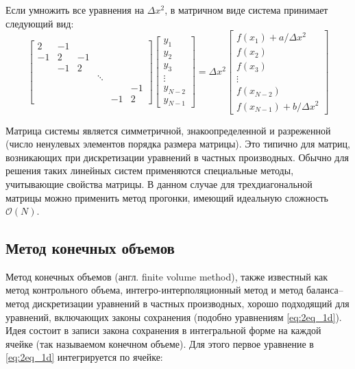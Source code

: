 \documentclass[a4paper, 11pt]{article}
\begin{document}
Если умножить все уравнения на $\Delta x ^2$, в матричном виде система принимает следующий вид:
\begin{equation}\label{eq:matrix_fd_1d}
	\begin{bmatrix}
		2  & -1 &   &       \\
		-1 &  2 & -1 \\
		   & -1 &  2 \\
		   &    &   & \ddots \\
		   &    &   &       &  & -1\\
		   &    &   &       & -1 & 2
		
	\end{bmatrix}
	\begin{bmatrix}
		y_1 \\ y_2 \\ y_3 \\ \vdots \\y_{N-2} \\ y_{N-1}
	\end{bmatrix}
	=
	\Delta x^2 
	\begin{bmatrix}
		f(x_1) + a/\Delta x^2 \\
		f(x_2)\\
		f(x_3)\\
		\vdots\\
		f(x_{N-2})\\
		f(x_{N-1}) + b/\Delta x^2 
	\end{bmatrix}
\end{equation}

Матрица системы является симметричной, знакоопределенной и разреженной (число ненулевых элементов порядка размера матрицы). Это типично для матриц, возникающих при дискретизации уравнений в частных производных. Обычно для решения таких линейных систем применяются специальные методы, учитывающие свойства матрицы. В данном случае для трехдиагональной матрицы можно применить метод прогонки, имеющий идеальную сложность $\mathcal{O}(N)$.

\subsection{Метод конечных объемов}
 Метод конечных объемов (англ. finite volume method), также известный как метод контрольного объема, интегро-интерполяционный метод и метод баланса– метод дискретизации уравнений в частных производных, хорошо подходящий для уравнений, включающих
законы сохранения (подобно уравнениям \eqref{eq:2eq_1d}). Идея состоит в записи закона сохранения
в интегральной форме на каждой ячейке (так называемом конечном объеме). Для этого
первое уравнение в \eqref{eq:2eq_1d} интегрируется по ячейке:
\end{document}
